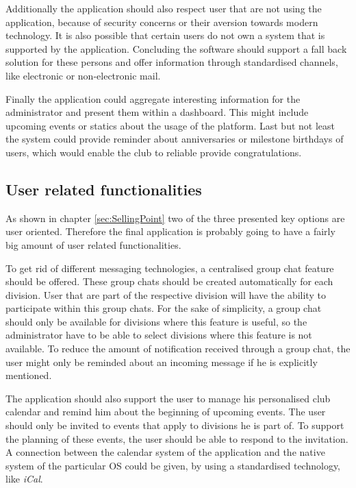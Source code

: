 Additionally the application should also respect user that are not using the application, because of security concerns or their aversion towards modern technology. It is also possible that certain users do not own a system that is supported by the application. Concluding the software should support a fall back solution for these persons and offer information through standardised channels, like electronic or non-electronic mail.

Finally the application could aggregate interesting information for the administrator and present them within a dashboard. This might include upcoming events or statics about the usage of the platform. Last but not least the system could provide reminder about anniversaries or milestone birthdays of users, which would enable the club to reliable provide congratulations.

\subsection{User related functionalities}

As shown in chapter \vref{sec:SellingPoint} two of the three presented key options are user oriented. Therefore the final application is probably going to have a fairly big amount of user related functionalities.

To get rid of different messaging technologies, a centralised group chat feature should be offered. These group chats should be created automatically for each division. User that are part of the respective division will have the ability to participate within this group chats. For the sake of simplicity, a group chat should only be available for divisions where this feature is useful, so the administrator have to be able to select divisions where this feature is not available. To reduce the amount of notification received through a group chat, the user might only be reminded about an incoming message if he is explicitly mentioned.

The application should also support the user to manage his personalised club calendar and remind him about the beginning of upcoming events. The user should only be invited to events that apply to divisions he is part of. To support the planning of these events, the user should be able to respond to the invitation. A connection between the calendar system of the application and the native system of the particular \gls{OS} could be given, by using a standardised technology, like \emph{iCal}.

